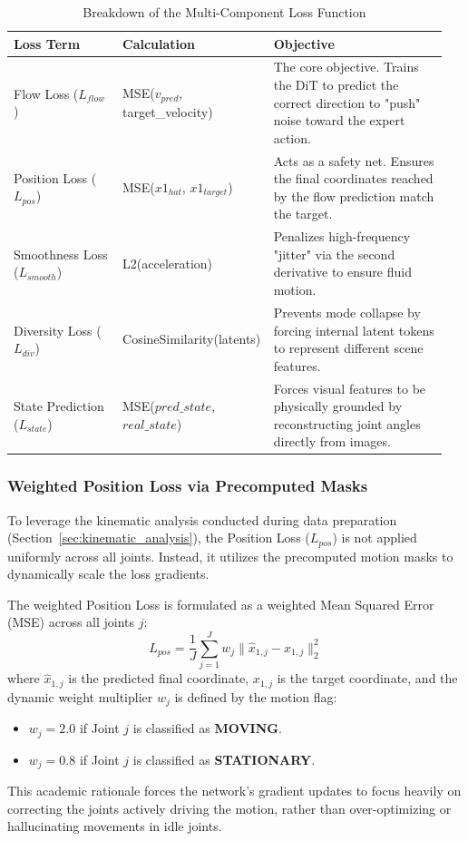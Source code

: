 \begin{table}[H]
    \centering
    \begin{tabular}{p{0.25\linewidth} p{0.3\linewidth} p{0.4\linewidth}}
        \toprule
        \textbf{Loss Term} & \textbf{Calculation} & \textbf{Objective} \\
        \midrule
        Flow Loss ($L_{flow}$) & MSE($v_{pred}$, target\_velocity) & The core objective. Trains the DiT to predict the correct direction to "push" noise toward the expert action. \\
        \addlinespace
        Position Loss ($L_{pos}$) & MSE($x1_{hat}$, $x1_{target}$) & Acts as a safety net. Ensures the final coordinates reached by the flow prediction match the target. \\
        \addlinespace
        Smoothness Loss ($L_{smooth}$) & L2(acceleration) & Penalizes high-frequency "jitter" via the second derivative to ensure fluid motion. \\
        \addlinespace
        Diversity Loss ($L_{div}$) & CosineSimilarity(latents) & Prevents mode collapse by forcing internal latent tokens to represent different scene features. \\
        \addlinespace
        State Prediction ($L_{state}$) & MSE($pred\_state$, $real\_state$) & Forces visual features to be physically grounded by reconstructing joint angles directly from images. \\
        \bottomrule
    \end{tabular}
    \caption{Breakdown of the Multi-Component Loss Function}
    \label{tab:loss_functions}
\end{table}

\subsubsection*{Weighted Position Loss via Precomputed Masks}
To leverage the kinematic analysis conducted during data preparation (Section~\ref{sec:kinematic_analysis}), the Position Loss ($L_{pos}$) is not applied uniformly across all joints. Instead, it utilizes the precomputed motion masks to dynamically scale the loss gradients. 

The weighted Position Loss is formulated as a weighted Mean Squared Error (MSE) across all joints $j$:
$$L_{pos} = \frac{1}{J} \sum_{j=1}^{J} w_j \| \hat{x}_{1,j} - x_{1,j} \|_2^2$$
where $\hat{x}_{1,j}$ is the predicted final coordinate, $x_{1,j}$ is the target coordinate, and the dynamic weight multiplier $w_j$ is defined by the motion flag:
\begin{itemize}
    \item $w_j = 2.0$ if Joint $j$ is classified as \textbf{MOVING}.
    \item $w_j = 0.8$ if Joint $j$ is classified as \textbf{STATIONARY}.
\end{itemize}
This academic rationale forces the network's gradient updates to focus heavily on correcting the joints actively driving the motion, rather than over-optimizing or hallucinating movements in idle joints.

